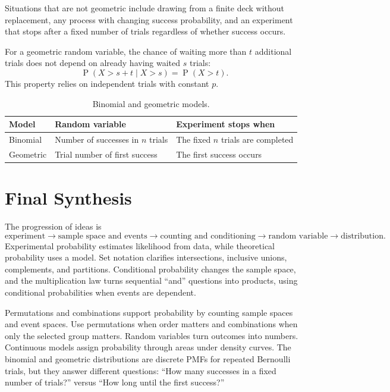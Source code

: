 \documentclass[11pt]{article}
\newcommand{\Pp}{\operatorname{P}}
\begin{document}
Situations that are not geometric include drawing from a finite deck without
replacement, any process with changing success probability, and an experiment
that stops after a fixed number of trials regardless of whether success occurs.

\begin{keybox}
For a geometric random variable, the chance of waiting more than $t$ additional
trials does not depend on already having waited $s$ trials:
\[
\Pp(X>s+t\mid X>s)=\Pp(X>t).
\]
This property relies on independent trials with constant $p$.
\end{keybox}

\begin{table}[ht]
\centering
\caption{Binomial and geometric models.}\label{tab:binom-geometric}
\begin{tabularx}{\textwidth}{@{}lYY@{}}
\toprule
Model & Random variable & Experiment stops when \\
\midrule
Binomial & Number of successes in $n$ trials & The fixed $n$ trials are completed \\
Geometric & Trial number of first success & The first success occurs \\
\bottomrule
\end{tabularx}
\end{table}

\section{Final Synthesis}\label{sec:synthesis}
The progression of ideas is
\[
\text{experiment}\longrightarrow
\text{sample space and events}\longrightarrow
\text{counting and conditioning}\longrightarrow
\text{random variable}\longrightarrow
\text{distribution}.
\]
Experimental probability estimates likelihood from data, while theoretical
probability uses a model.  Set notation clarifies intersections, inclusive
unions, complements, and partitions.  Conditional probability changes the sample
space, and the multiplication law turns sequential ``and'' questions into
products, using conditional probabilities when events are dependent.

Permutations and combinations support probability by counting sample spaces and
event spaces.  Use permutations when order matters and combinations when only
the selected group matters.  Random variables turn outcomes into numbers.
Continuous models assign probability through areas under density curves.  The
binomial and geometric distributions are discrete PMFs for repeated Bernoulli
trials, but they answer different questions: ``How many successes in a fixed
number of trials?'' versus ``How long until the first success?''
\end{document}
